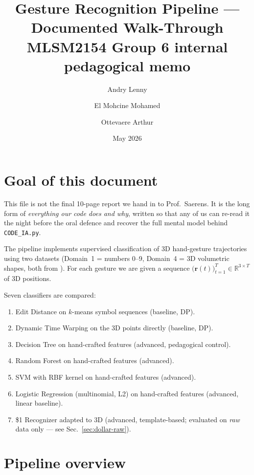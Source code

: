 \documentclass[11pt,a4paper]{article}
\title{\textbf{Gesture Recognition Pipeline --- Documented Walk-Through}\\
\large MLSM2154 Group 6 internal pedagogical memo}
\author{Andry Lenny \and El Mohcine Mohamed \and Ottevaere Arthur}
\date{May 2026}
\begin{document}
\maketitle
\tableofcontents
\bigskip

\section{Goal of this document}

This file is not the final 10-page report we hand in to Prof.\ Saerens.
It is the long form of \emph{everything our code does and why}, written so
that any of us can re-read it the night before the oral defence and
recover the full mental model behind \texttt{CODE\_IA.py}.

The pipeline implements supervised classification of 3D hand-gesture
trajectories using two datasets (Domain~1 = numbers 0--9, Domain~4 = 3D
volumetric shapes, both from \cite{huang2019gesture}). For each gesture
we are given a sequence
$\bigl(\mathbf{r}(t)\bigr)_{t=1}^{T}\in\mathbb{R}^{3\times T}$ of 3D
positions.

Seven classifiers are compared:
\begin{enumerate}[itemsep=0.2em,topsep=0.2em]
    \item Edit Distance on $k$-means symbol sequences (baseline, DP).
    \item Dynamic Time Warping on the 3D points directly (baseline, DP).
    \item Decision Tree on hand-crafted features (advanced, pedagogical
          control).
    \item Random Forest on hand-crafted features (advanced).
    \item SVM with RBF kernel on hand-crafted features (advanced).
    \item Logistic Regression (multinomial, L2) on hand-crafted features
          (advanced, linear baseline).
    \item \$1 Recognizer adapted to 3D (advanced, template-based; evaluated
          on \emph{raw} data only --- see Sec.~\ref{sec:dollar-raw}).
\end{enumerate}

\section{Pipeline overview}
\end{document}
